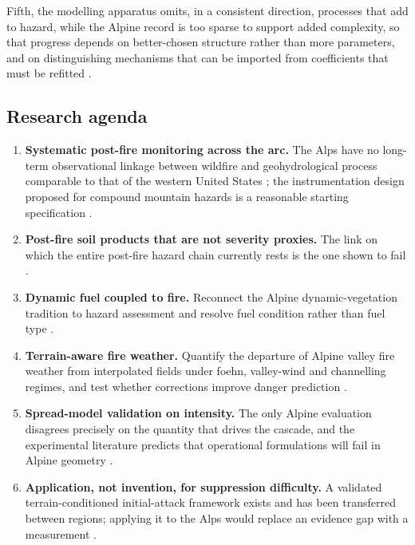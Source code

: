 \documentclass[11pt,a4paper]{article}
\begin{document}
Fifth, the modelling apparatus omits, in a consistent direction, processes that add to hazard, while the Alpine record is too sparse to support added complexity, so that progress depends on better-chosen structure rather than more parameters, and on distinguishing mechanisms that can be imported from coefficients that must be refitted \citep{conedera_linking_2024, de_angelis_modelling_2015, diakakis_exploring_2023, cardil_assessing_2025}.

\subsection{Research agenda}

\begin{enumerate}
    \item \textbf{Systematic post-fire monitoring across the arc.} The Alps have no long-term observational linkage between wildfire and geohydrological process comparable to that of the western United States \citep{melzner_wildfire-induced_2025}; the instrumentation design proposed for compound mountain hazards is a reasonable starting specification \citep{baselt_compound_2026}.
    \item \textbf{Post-fire soil products that are not severity proxies.} The link on which the entire post-fire hazard chain currently rests is the one shown to fail \citep{negri_wildfire_2026}.
    \item \textbf{Dynamic fuel coupled to fire.} Reconnect the Alpine dynamic-vegetation tradition to hazard assessment and resolve fuel condition rather than fuel type \citep{schumacher_relative_2006, hillebrand_contrasting_2023, muller_towards_2020}.
    \item \textbf{Terrain-aware fire weather.} Quantify the departure of Alpine valley fire weather from interpolated fields under foehn, valley-wind and channelling regimes, and test whether corrections improve danger prediction \citep{ozaki_impact_2022, sharples_overview_2009}.
    \item \textbf{Spread-model validation on intensity.} The only Alpine evaluation disagrees precisely on the quantity that drives the cascade, and the experimental literature predicts that operational formulations will fail in Alpine geometry \citep{malanchini_modeling_2025, hayajneh_wind_2026}.
    \item \textbf{Application, not invention, for suppression difficulty.} A validated terrain-conditioned initial-attack framework exists and has been transferred between regions; applying it to the Alps would replace an evidence gap with a measurement \citep{cardil_assessing_2025}.

\end{enumerate}
\end{document}
